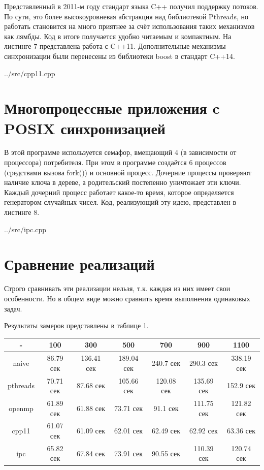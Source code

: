 \documentclass[a4paper, 12pt]{report}		%
\begin{document}
Представленный в 2011-м году стандарт языка C++ получил поддержку потоков. По сути, это более высокоуровневая абстракция над библиотекой Pthreads, но работать становится на много приятнее за счёт использования таких механизмов как лямбды. Код в итоге получается удобно читаемым и компактным. На листинге 7 представлена работа с C++11. Дополнительные механизмы синхронизации были перенесены из библиотеки boost в стандарт C++14.


{../src/cpp11.cpp}


\chapter*{Многопроцессные приложения c POSIX синхронизацией}

В этой программе используется семафор, вмещающий 4 (в зависимости от процессора) потребителя. При этом в программе создаётся 6 процессов (средствами вызова fork()) и основной процесс. Дочерние процессы проверяют наличие ключа в дереве, а родительский постепенно уничтожает эти ключи. Каждый дочерний процесс работает какое-то время, которое определяется генератором случайных чисел. Код, реализующий эту идею, представлен в листинге 8.


{../src/ipc.cpp}



\chapter*{Сравнение реализаций}

Строго сравнивать эти реализации нельзя, т.к. каждая из них имеет свои особенности. Но в общем виде можно сравнить время выполнения одинаковых задач.

Результаты замеров представлены в таблице 1.

\begin{table}[!h]
\centering
\begin{tabular}{|c|c|c|c|c|c|c|}
\hline 
- & 100 & 300 & 500 & 700 & 900 & 1100 \\ 
\hline 
naive & 86.79 сек & 136.41 сек & 189.04 сек & 240.7 сек & 290.3 сек & 338.19 сек \\ 
\hline 
pthreads & 70.71 сек & 87.68 сек & 105.66 сек & 120.08 сек & 135.69 сек & 152.9 сек \\ 
\hline 
openmp & 61.89 сек & 61.88 сек & 73.71 сек & 91.1 сек & 111.75 сек & 121.82 сек \\ 
\hline 
cpp11 & 61.07 сек & 61.09 сек & 62.01 сек & 62.49 сек & 62.92 сек & 63.36 сек \\ 
\hline 
ipc & 65.82 сек & 67.84 сек & 73.91 сек & 90.55 сек & 110.39 сек & 120.74 сек \\ 
\hline 
\end{tabular} 
\end{table}
\end{document}
